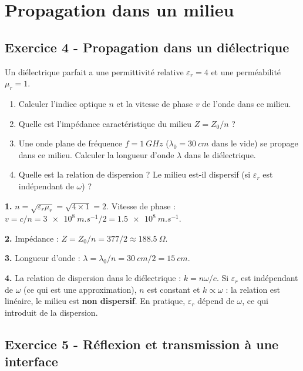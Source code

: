 \documentclass[12pt,a4paper]{article}
\begin{document}
\section{Propagation dans un milieu}

\subsection*{Exercice 4 - Propagation dans un diélectrique \niveau{\moyen}}

\begin{boiteexercice}
Un diélectrique parfait a une permittivité relative $\varepsilon_r = 4$ et une perméabilité $\mu_r = 1$.
\begin{enumerate}
  \item Calculer l'indice optique $n$ et la vitesse de phase $v$ de l'onde dans ce milieu.
  \item Quelle est l'impédance caractéristique du milieu $Z = Z_0/n$ ?
  \item Une onde plane de fréquence $f = \qty{1}{GHz}$ ($\lambda_0 = \qty{30}{cm}$ dans le vide) se propage dans ce milieu. Calculer la longueur d'onde $\lambda$ dans le diélectrique.
  \item Quelle est la relation de dispersion ? Le milieu est-il dispersif (si $\varepsilon_r$ est indépendant de $\omega$) ?
\end{enumerate}
\end{boiteexercice}

\begin{boitecorrige}
\textbf{1.} $n = \sqrt{\varepsilon_r\mu_r} = \sqrt{4\times1} = 2$. Vitesse de phase : $v = c/n = \qty{3e8}{m.s^{-1}}/2 = \qty{1.5e8}{m.s^{-1}}$.

\textbf{2.} Impédance : $Z = Z_0/n = 377/2 \approx \qty{188.5}{\Omega}$.

\textbf{3.} Longueur d'onde : $\lambda = \lambda_0/n = \qty{30}{cm}/2 = \qty{15}{cm}$.

\textbf{4.} La relation de dispersion dans le diélectrique : $k = n\omega/c$. Si $\varepsilon_r$ est indépendant de $\omega$ (ce qui est une approximation), $n$ est constant et $k\propto\omega$ : la relation est linéaire, le milieu est \textbf{non dispersif}. En pratique, $\varepsilon_r$ dépend de $\omega$, ce qui introduit de la dispersion.
\end{boitecorrige}

\subsection*{Exercice 5 - Réflexion et transmission à une interface \niveau{\difficile}}
\end{document}
